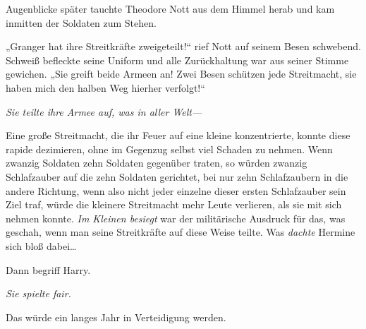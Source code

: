 Augenblicke später tauchte Theodore Nott aus dem Himmel herab und kam inmitten der Soldaten zum Stehen.

„Granger hat ihre Streitkräfte zweigeteilt!“ rief Nott auf seinem Besen schwebend. Schweiß befleckte seine Uniform und alle Zurückhaltung war aus seiner Stimme gewichen. „Sie greift beide Armeen an! Zwei Besen schützen jede Streitmacht, sie haben mich den halben Weg hierher verfolgt!“

\emph{Sie teilte ihre Armee auf, was in aller Welt—}

Eine große Streitmacht, die ihr Feuer auf eine kleine konzentrierte, konnte diese rapide dezimieren, ohne im Gegenzug selbst viel Schaden zu nehmen. Wenn zwanzig Soldaten zehn Soldaten gegenüber traten, so würden zwanzig Schlafzauber auf die zehn Soldaten gerichtet, bei nur zehn Schlafzaubern in die andere Richtung, wenn also nicht jeder einzelne dieser ersten Schlafzauber sein Ziel traf, würde die kleinere Streitmacht mehr Leute verlieren, als sie mit sich nehmen konnte. \emph{Im Kleinen besiegt} war der militärische Ausdruck für das, was geschah, wenn man seine Streitkräfte auf diese Weise teilte. Was \emph{dachte} Hermine sich bloß dabei…%

Dann begriff Harry.

\emph{Sie spielte fair.}

Das würde ein langes Jahr in Verteidigung werden.

